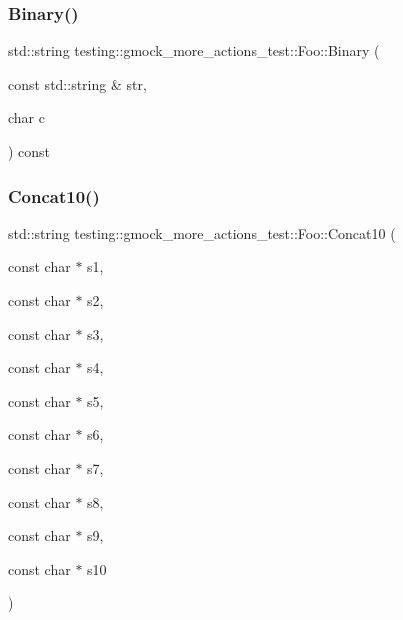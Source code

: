 \mbox{\label{classtesting_1_1gmock__more__actions__test_1_1_foo_a8ee56742c6c025af680617464c71ecef}} 
\subsubsection{\texorpdfstring{Binary()}{Binary()}\hspace{0.1cm}{\footnotesize\ttfamily [3/3]}}
{\footnotesize\ttfamily std\+::string testing\+::gmock\+\_\+more\+\_\+actions\+\_\+test\+::\+Foo\+::\+Binary (\begin{DoxyParamCaption}\item[{const std\+::string \&}]{str,  }\item[{char}]{c }\end{DoxyParamCaption}) const\hspace{0.3cm}{\ttfamily [inline]}}

\mbox{\label{classtesting_1_1gmock__more__actions__test_1_1_foo_ad5b1d2dd1bcec98fdc90a05487ec3b14}} 
\subsubsection{\texorpdfstring{Concat10()}{Concat10()}\hspace{0.1cm}{\footnotesize\ttfamily [1/3]}}
{\footnotesize\ttfamily std\+::string testing\+::gmock\+\_\+more\+\_\+actions\+\_\+test\+::\+Foo\+::\+Concat10 (\begin{DoxyParamCaption}\item[{const char $\ast$}]{s1,  }\item[{const char $\ast$}]{s2,  }\item[{const char $\ast$}]{s3,  }\item[{const char $\ast$}]{s4,  }\item[{const char $\ast$}]{s5,  }\item[{const char $\ast$}]{s6,  }\item[{const char $\ast$}]{s7,  }\item[{const char $\ast$}]{s8,  }\item[{const char $\ast$}]{s9,  }\item[{const char $\ast$}]{s10 }\end{DoxyParamCaption})\hspace{0.3cm}{\ttfamily [inline]}}


